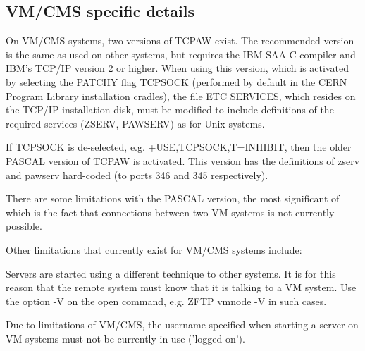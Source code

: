 \subsection{VM/CMS specific details}
\par
On VM/CMS systems, two versions of TCPAW exist. The recommended
version is the same as used on other systems, but requires the
IBM SAA C compiler and IBM's TCP/IP version 2 or higher.
When using this version, which is activated by selecting the PATCHY
flag TCPSOCK (performed by default in the CERN Program Library
installation cradles), the file ETC SERVICES, which resides on
the TCP/IP installation disk, must be modified to include
definitions of the required services (ZSERV, PAWSERV) as
for Unix systems.
\par
If TCPSOCK is de-selected, e.g. +USE,TCPSOCK,T=INHIBIT, then
the older PASCAL version of TCPAW is activated. This version
has the definitions of zserv and pawserv hard-coded (to ports
346 and 345 respectively).
\par
There are some limitations with the PASCAL version,
the most significant of which is the
fact that connections between two VM systems is not currently possible.
\par
Other limitations that currently exist for VM/CMS systems include:
\begin{OL}
\item
Servers are started using a different technique to other systems.
It is for this reason that the remote system must know that it is
talking to a VM system.
Use the option -V on the open command, e.g. ZFTP vmnode -V in
such cases.
\item
Due to limitations of VM/CMS, the username specified when starting
a server on VM systems must not be currently in use ('logged on').
\end{OL}

